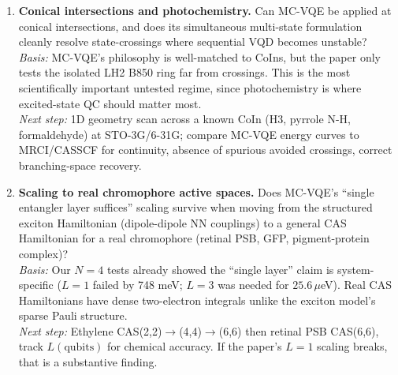 \begin{enumerate}
\item \textbf{Conical intersections and photochemistry.}
Can MC-VQE be applied at conical intersections, and does its simultaneous
multi-state formulation cleanly resolve state-crossings where sequential VQD
becomes unstable? \\
\emph{Basis:} MC-VQE's philosophy is well-matched to CoIns, but the paper only
tests the isolated LH2 B850 ring far from crossings. This is the most
scientifically important untested regime, since photochemistry is where
excited-state QC should matter most. \\
\emph{Next step:} 1D geometry scan across a known CoIn (H3, pyrrole N-H,
formaldehyde) at STO-3G/6-31G; compare MC-VQE energy curves to MRCI/CASSCF for
continuity, absence of spurious avoided crossings, correct branching-space
recovery.

\item \textbf{Scaling to real chromophore active spaces.}
Does MC-VQE's ``single entangler layer suffices'' scaling survive when moving
from the structured exciton Hamiltonian (dipole-dipole NN couplings) to a
general CAS Hamiltonian for a real chromophore (retinal PSB, GFP,
pigment-protein complex)? \\
\emph{Basis:} Our $N=4$ tests already showed the ``single layer'' claim is
system-specific ($L=1$ failed by 748 meV; $L=3$ was needed for $25.6\,\mu$eV).
Real CAS Hamiltonians have dense two-electron integrals unlike the exciton
model's sparse Pauli structure. \\
\emph{Next step:} Ethylene CAS(2,2)$\to$(4,4)$\to$(6,6) then retinal PSB
CAS(6,6), track $L(\text{qubits})$ for chemical accuracy. If the paper's
$L=1$ scaling breaks, that is a substantive finding.

\end{enumerate}
